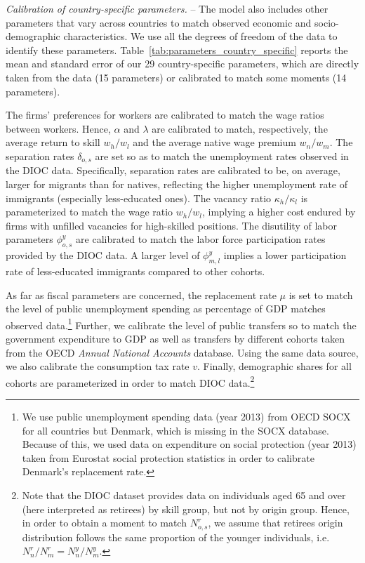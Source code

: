 \documentclass[a4paper,12pt]{article}
\begin{document}
\emph{Calibration of country-specific parameters.} -- The model also includes other parameters that vary across countries to match observed economic and socio-demographic characteristics. We use all the degrees of freedom of the data to identify these parameters. Table~\ref{tab:parameters_country_specific} reports the mean and standard error of our 29 country-specific parameters, which are directly taken from the data (15 parameters) or calibrated to match some moments (14 parameters).

The firms’ preferences for workers are calibrated to match the wage ratios between workers. Hence, $\alpha$ and $\lambda$ are calibrated to match, respectively, the average return to skill $w_h/w_l$ and the average native wage premium $w_n/w_m$. The separation rates $\delta_{o,s}$ are set so as to match the unemployment rates observed in the DIOC data. Specifically, separation rates are calibrated to be, on average, larger for migrants than for natives, reflecting the higher unemployment rate of immigrants (especially less-educated ones). The vacancy ratio $\kappa_h / \kappa_l$ is parameterized to match the wage ratio $w_h/w_l$, implying a higher cost endured by firms with unfilled vacancies for high-skilled positions. The disutility of labor parameters $\phi^y_{o,s}$ are calibrated to match the labor force participation rates provided by the DIOC data. A larger level of $\phi^y_{m,l}$ implies a lower participation rate of less-educated immigrants compared to other cohorts.

As far as fiscal parameters are concerned, the replacement rate $\mu$ is set to match the level of public unemployment spending as percentage of GDP matches observed data.\footnote{We use public unemployment spending data (year  2013) from OECD SOCX for all countries but Denmark, which is missing in the SOCX database. Because of this, we used data on expenditure on social protection (year 2013) taken from Eurostat social protection statistics in order to calibrate Denmark's replacement rate.} Further, we calibrate the level of public transfers so to match the government expenditure to GDP as well as transfers by different cohorts taken from the OECD \textit{Annual National Accounts} database. Using the same data source, we also calibrate the consumption tax rate $v$. Finally, demographic shares for all cohorts are parameterized in order to match DIOC data.\footnote{Note that the DIOC dataset provides data on individuals aged 65 and over (here interpreted as retirees) by skill group, but not by origin group. Hence, in order to obtain a moment to match $N^r_{o,s}$, we assume that retirees origin distribution follows the same proportion of the younger individuals, i.e. $N^r_n/N^r_m=N^y_n/N^y_m$.}
\end{document}
